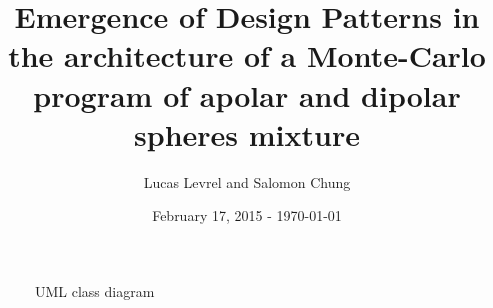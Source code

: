 \documentclass{article}
\title{Emergence of Design Patterns in the architecture of a Monte-Carlo program of
    apolar and dipolar spheres mixture}
\author{Lucas Levrel and Salomon Chung}
\date{February 17, 2015 - \today{}}
\begin{document}
\maketitle

    \begin{figure}[htb]
        \centering
        
        \caption{UML class diagram}
    \end{figure}
\end{document}
